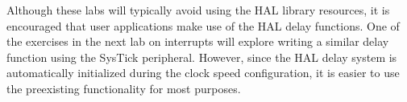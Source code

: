 \documentclass[11pt,fleqn]{book} %
\newcommand{\code}[3]{
    \begin{figure}[]
        \begin{center}
            \hspace*{-3.4cm}
            \colorbox{gray!20!white}{
                \parbox{0.8\paperwidth} {
                    
                }
            }
            \caption{#2}
            \label{#3}
        \end{center}
    \end{figure}
}
\begin{document}
Although these labs will typically avoid using the HAL library resources, it is encouraged that user applications make use of the HAL delay functions. One of the exercises in the next lab on interrupts will explore writing a similar delay function using the SysTick peripheral. However, since the HAL delay system is automatically initialized during the clock speed configuration, it is easier to use the preexisting functionality for most purposes. 
%
%
%
%
%
%
%
\end{document}
